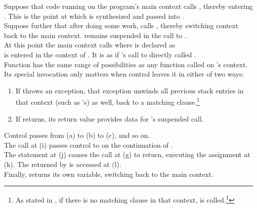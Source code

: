 Suppose that code running on the program's main context calls ,
thereby entering . This is the point at which  is synthesized
and passed into .\\
Suppose further that after doing some work,  calls ,
thereby switching context back to the main context.  remains suspended
in the call to .\\
At this point the main context calls 
where  is declared as\\
  is entered in the context of .
It is as if 's call to  directly called .\\
Function  has the same range of possibilities as any function called on
's context. Its special invocation only matters when control leaves it
in either of two ways:

\begin{enumerate}
  \item If  throws an exception, that exception unwinds all previous
        stack entries in that context (such as 's) as well, back to a
        matching  clause.\footnote{As stated in ,
        if there is no matching  clause in that context,
         is called.\footnote{There are only two ways to
        terminate a given context without terminating the whole process. One
        is to switch to some context that will destroy the continuation passed
        (or returned) to it. The other is to return a valid continuation from
        the \entryfn. If an  function throws an
        exception, it is good practice to bind into the exception object
        the continuation passed into the  function so that
        a  clause in the \entryfn can return that continuation.}}
  \item If  returns, its return value provides data for
        's suspended  call.
\end{enumerate}


Control passes from (a) to (b) to (c), and so on.\\
The  call at (i) passes control
to  on the continuation of .\\
The  statement at (j) causes the \op call at (g) to return,
executing the assignment at (k). The  returned by  is
accessed at (l).\\
Finally,  returns its own  variable, switching back to the main
context.


